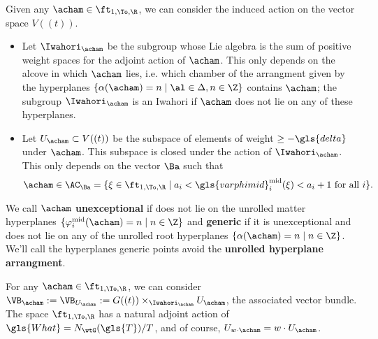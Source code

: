 Given any $\acham\in \ft_{1,
  \To,\R}$, we can consider the induced action on the
vector space $V((t))$.  
\begin{itemize}
\item Let $\Iwahori_\acham$ be the subgroup whose Lie algebra is the sum of positive weight
spaces for the adjoint action of $\acham$. This only depends on the
alcove in which $\acham$ lies, i.e. which chamber of the arrangment
given by the hyperplanes $\{\alpha(\acham)=n\mid \al\in \Delta, n\in \Z\}$ contains
$\acham$; the subgroup $\Iwahori_\acham$ is an Iwahori if $\acham$ does not
lie on any of these hyperplanes. 
\item Let  $U_\acham\subset V((t))$ be the subspace of elements of 
weight $\geq -\gls{delta}$ under $\acham$.  This subspace is closed under the action of
$\Iwahori_\acham$.  This only depends on the vector $\Ba$ such that
\begin{equation}
\acham\in \AC_{\Ba}=\{\xi \in \ft_{1,
  \To,\R}\mid a_i<\gls{varphimid}_i^{\operatorname{mid}}(\xi)<a_i+1\text{
  for all $i$}\}.\label{eq:aff-cham}
\end{equation}
\end{itemize}

We call $\acham$ {\bf unexceptional} if does not lie on the unrolled matter hyperplanes
$\{\varphi_i^{\operatorname{mid}}(\acham)=n\mid n\in
\Z\}$ and {\bf generic} if it is unexceptional and does not lie on any
of the unrolled root hyperplanes $\{\alpha(\acham)=n\mid
n\in\Z\}$. We'll call the hyperplanes generic points avoid the {\bf
  unrolled hyperplane arrangment}.  

For any $\acham\in  \ft_{1,
  \To,\R}$, we can
consider
$\VB_{\acham}:=\VB_{U_\acham}:=G((t))\times_{\Iwahori_{\acham}}U_{\acham}$,
the associated vector bundle.  
The space $ \ft_{1,
  \To,\R}$ has a natural adjoint action of
$\gls{What}=N_{\wtG}(\gls{T})/T$, and of course,
$U_{w\cdot \acham}=w\cdot U_{\acham}$.  

